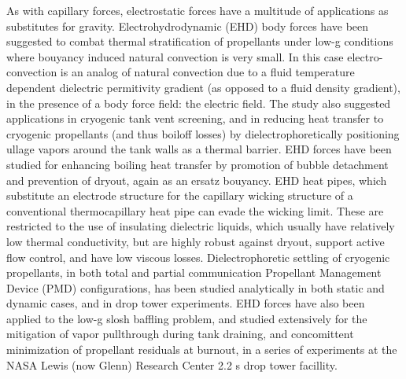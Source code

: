 \documentclass[12pt,a4paper,oneside]{book}
\begin{document}
As with capillary forces, electrostatic forces have a multitude of applications as substitutes for gravity. Electrohydrodynamic (EHD) body forces have been suggested to combat thermal stratification of propellants under low-g conditions where bouyancy induced natural convection is very small\cite{blackmon_collection_1965}. In this case electro-convection is an analog of natural convection due to a fluid temperature dependent dielectric permitivity gradient (as opposed to a fluid density gradient), in the presence of a body force field: the electric field. The study also suggested applications in cryogenic tank vent screening, and in reducing heat transfer to cryogenic propellants (and thus boiloff losses) by dielectrophoretically positioning ullage vapors around the tank walls as a thermal barrier. EHD forces have been studied for enhancing boiling heat transfer by promotion of bubble detachment and prevention of dryout, again as an ersatz bouyancy\cite{snyder_dielectrophoresis_2001}\cite{di_marco_influence_2003}\cite{marco_use_2012}. EHD heat pipes, which substitute an electrode structure for the capillary wicking structure of a conventional thermocapillary heat pipe can evade the wicking limit\cite{jones_electrohydrodynamic_1973}. These are restricted to the use of insulating dielectric liquids, which usually have relatively low thermal conductivity, but are highly robust against dryout, support active flow control, and have low viscous losses. Dielectrophoretic settling of cryogenic propellants, in both total and partial communication Propellant Management Device (PMD) configurations, has been studied analytically in both static\cite{hurwitz_electrohydrodynamic_1966} and dynamic cases\cite{koval_dynamics_1967}, and in drop tower experiments\cite{fax_dielectrophoretic_1969}. EHD forces have also been applied to the low-g slosh baffling problem\cite{boretz_orbital_1970}\cite{petrash_use_1968}\cite{hurwitz_dielectrophoretic_1968}, and studied extensively for the mitigation of vapor pullthrough during tank draining, and concomittent minimization of propellant residuals at burnout, in a series of experiments at the NASA Lewis (now Glenn) Research Center 2.2 s drop tower facillity\cite{berenyi_dielectrophoretic_1970}. 
\end{document}
